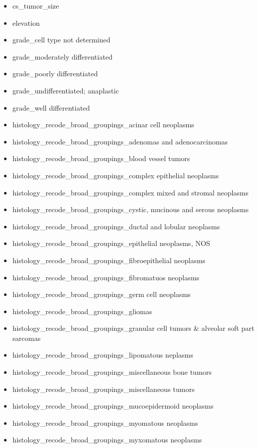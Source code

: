 \documentclass[a4paper,11pt]{article}
\begin{document}
\begin{itemize}[noitemsep]
\item cs\_tumor\_size
\item elevation
\item grade\_cell type not determined
\item grade\_moderately differentiated
\item grade\_poorly differentiated
\item grade\_undifferentiated; anaplastic
\item grade\_well differentiated
\item histology\_recode\_broad\_groupings\_acinar cell neoplasms
\item histology\_recode\_broad\_groupings\_adenomas and adenocarcinomas
\item histology\_recode\_broad\_groupings\_blood vessel tumors
\item histology\_recode\_broad\_groupings\_complex epithelial neoplasms
\item histology\_recode\_broad\_groupings\_complex mixed and stromal neoplasms
\item histology\_recode\_broad\_groupings\_cystic, mucinous and serous neoplasms
\item histology\_recode\_broad\_groupings\_ductal and lobular neoplasms
\item histology\_recode\_broad\_groupings\_epithelial neoplasms, NOS
\item histology\_recode\_broad\_groupings\_fibroepithelial neoplasms
\item histology\_recode\_broad\_groupings\_fibromatuos neoplasms
\item histology\_recode\_broad\_groupings\_germ cell neoplasms
\item histology\_recode\_broad\_groupings\_gliomas
\item histology\_recode\_broad\_groupings\_granular cell tumors \& alveolar soft part sarcomas
\item histology\_recode\_broad\_groupings\_lipomatous neplasms
\item histology\_recode\_broad\_groupings\_miscellaneous bone tumors
\item histology\_recode\_broad\_groupings\_miscellaneous tumors
\item histology\_recode\_broad\_groupings\_mucoepidermoid neoplasms
\item histology\_recode\_broad\_groupings\_myomatous neoplasms
\item histology\_recode\_broad\_groupings\_myxomatous neoplasms

\end{itemize}
\end{document}
